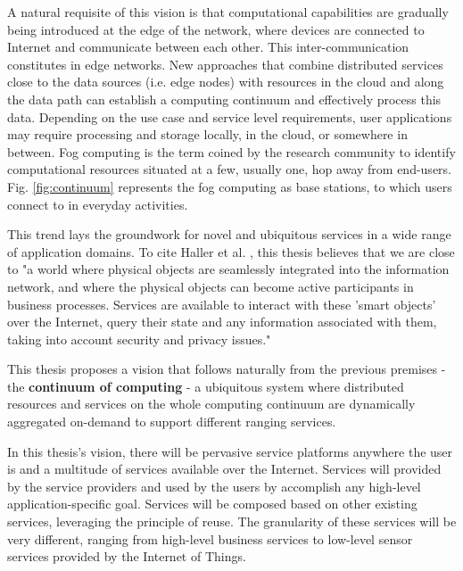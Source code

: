 A natural requisite of this vision is that computational capabilities are gradually being introduced at the edge of the network, where devices are connected to Internet and communicate between each other. This inter-communication constitutes in edge networks. New approaches that combine distributed services close to the data sources (i.e. edge nodes) with resources in the cloud and along the data path can establish a computing continuum and effectively process this data. Depending on the use case and service level requirements, user applications may require processing and storage locally, in the cloud, or somewhere in between. Fog computing \cite{fog-computing} is the term coined by the research community to identify computational resources situated at a few, usually one, hop away from end-users. Fig. \ref{fig:continuum} represents the fog computing as base stations, to which users connect to in everyday activities.

This trend lays the groundwork for novel and ubiquitous services in a wide range of application domains. To cite Haller et al. \cite{iot-enterprise}, this thesis believes that we are close to "a world where physical objects are seamlessly integrated into the information network, and where the physical objects can become active participants in business processes. Services are available to interact with these 'smart objects' over the Internet, query their state and any information associated with them, taking into account security and privacy issues."

This thesis proposes a vision that follows naturally from the previous premises - the \textbf{continuum of computing} - a ubiquitous system where distributed resources and services on the whole computing continuum are dynamically aggregated on-demand to support different ranging services.

In this thesis's vision, there will be pervasive service platforms anywhere the user is and a multitude of services available over the Internet. Services will provided by the service providers and used by the users by accomplish any high-level application-specific goal. Services will be composed based on other existing services, leveraging the principle of reuse. The granularity of these services will be very different, ranging from high-level business services to low-level sensor services provided by the Internet of Things.

